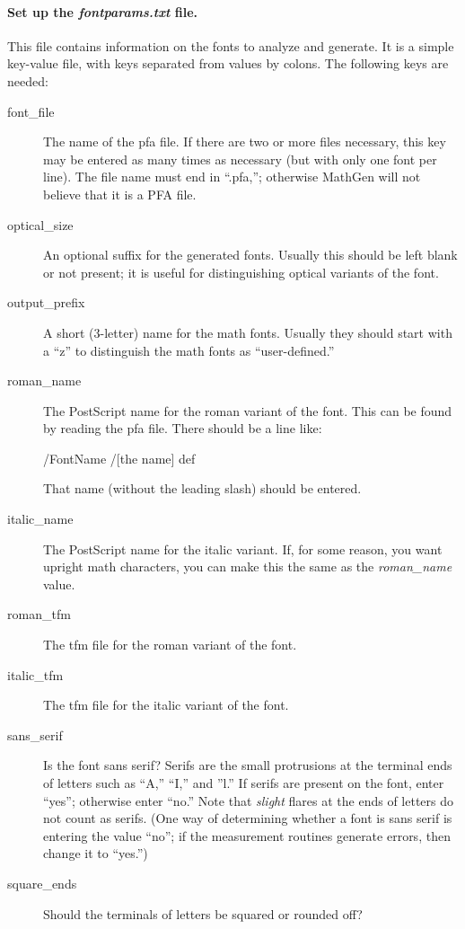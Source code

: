 \paragraph{Set up the \emph{fontparams.txt} file.} This file contains
information on the fonts to analyze and generate. It is a simple key-value file,
with keys separated from values by colons. The following keys are needed:
\begin{description}
\item[font\_file] The name of the \ac{pfa} file. If there are two or more files
necessary, this key may be entered as many times as necessary (but with only one
font per line). The file name must end in ``.pfa,''; otherwise MathGen will not
believe that it is a \ac{PFA} file.
\item[optical\_size] An optional suffix for the generated fonts. Usually this
should be left blank or not present; it is useful for distinguishing optical
variants of the font.
\item[output\_prefix] A short (3-letter) name for the math fonts. Usually they
should start with a ``z'' to distinguish the math fonts as ``user-defined.''
\item[roman\_name] The PostScript name for the roman variant of the font. This
can be found by reading the \ac{pfa} file. There should be a line like:
\begin{center}/FontName /[the name] def\end{center}
That name (without the leading slash) should be entered.
\item[italic\_name] The PostScript name for the italic variant. If, for some
reason, you want upright math characters, you can make this the same as the
\emph{roman\_name} value.
\item[roman\_tfm] The \ac{tfm} file for the roman variant of the font.
\item[italic\_tfm] The \ac{tfm} file for the italic variant of the font.
\item[sans\_serif] Is the font sans serif? Serifs are the small protrusions at
the terminal ends of letters such as ``A,'' ``I,'' and ''l.'' If serifs are
present on the font, enter ``yes''; otherwise enter ``no.'' Note that
\emph{slight} flares at the ends of letters do not count as serifs. (One way of
determining whether a font is sans serif is entering the value ``no''; if the
measurement routines generate errors, then change it to ``yes.'')
\item[square\_ends] Should the terminals of letters be squared or rounded off?

\end{description}
